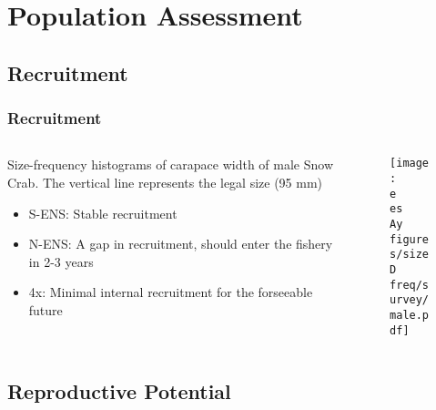 \section{Population Assessment}
\subsection{Recruitment}

\begin{frame}
\frametitle{Recruitment}
\begin{columns}
	\begin{column}{0.5\textwidth}
	Size-frequency histograms of carapace width of male Snow Crab. The vertical line represents the legal size (95 mm)
	\begin{itemize}
		\item S-ENS: Stable recruitment
		\item N-ENS: A gap in recruitment, should enter the fishery in 2-3 years
		\item 4x: Minimal internal recruitment for the forseeable future  
	\end{itemize}
	\end{column}

	\begin{column}{0.5\textwidth}
	\begin{figure}
		\texttt{[image: \\e \\es \\Ay figures/size\\D freq/survey/male.pdf]}
	\end{figure}
	\end{column}
	\end{columns}
\end{frame}

\subsection{Reproductive Potential}

